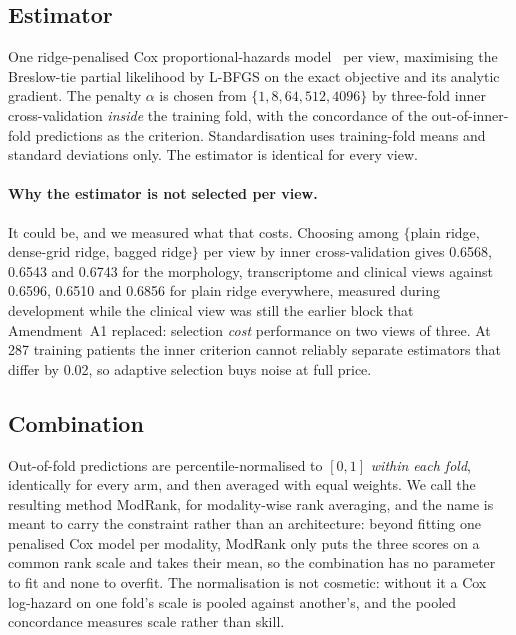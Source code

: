 \subsection*{Estimator}

One ridge-penalised Cox proportional-hazards model~\citep{cox1972regression,simon2011regularization}
per view, maximising the Breslow-tie partial likelihood by L-BFGS on the exact objective and its
analytic gradient. The penalty $\alpha$ is chosen from $\{1, 8, 64, 512, 4096\}$ by three-fold
inner cross-validation \emph{inside} the training fold, with the concordance of the
out-of-inner-fold predictions as the criterion. Standardisation uses training-fold means and
standard deviations only. The estimator is identical for every view.

\paragraph{Why the estimator is not selected per view.} It could be, and we measured what that
costs. Choosing among $\{$plain ridge, dense-grid ridge, bagged ridge$\}$ per view by inner
cross-validation gives 0.6568, 0.6543 and 0.6743 for the morphology, transcriptome and clinical
views against 0.6596, 0.6510 and 0.6856 for plain ridge everywhere, measured during development
while the clinical view was still the earlier block that Amendment~A1 replaced: selection
\emph{cost} performance on two views of three. At 287 training patients the inner criterion cannot reliably
separate estimators that differ by 0.02, so adaptive selection buys noise at full price.

\subsection*{Combination}

Out-of-fold predictions are percentile-normalised to $[0,1]$ \emph{within each fold}, identically
for every arm, and then averaged with equal weights. We call the resulting method ModRank,
for modality-wise rank averaging, and the name is meant to carry the constraint rather than an
architecture: beyond fitting one penalised Cox model per modality, ModRank only puts the three scores on a common rank scale and takes their mean, so the combination has no
parameter to fit and none to overfit. The normalisation is not cosmetic: without it
a Cox log-hazard on one fold's scale is pooled against another's, and the pooled concordance
measures scale rather than skill.

